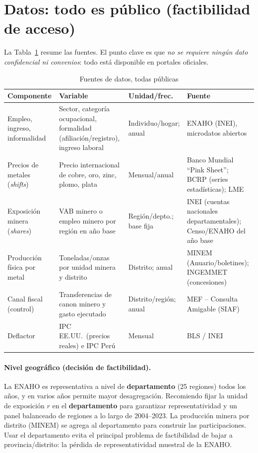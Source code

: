 \documentclass[11pt]{article}
\begin{document}
\section{Datos: todo es público (factibilidad de acceso)}

La Tabla~\ref{tab:datos} resume las fuentes. El punto clave es que \emph{no se requiere ningún
dato confidencial ni convenios}: todo está disponible en portales oficiales.

\begin{table}[h]
\centering
\small
\caption{Fuentes de datos, todas públicas}
\label{tab:datos}
\begin{tabular}{p{3.2cm} p{4.2cm} p{2.3cm} p{4.4cm}}
\toprule
\textbf{Componente} & \textbf{Variable} & \textbf{Unidad/frec.} & \textbf{Fuente} \\
\midrule
Empleo, ingreso, informalidad & Sector, categoría ocupacional, formalidad (afiliación/registro), ingreso laboral & Individuo/hogar; anual & ENAHO (INEI), microdatos abiertos \\
\addlinespace
Precios de metales (\textit{shifts}) & Precio internacional de cobre, oro, zinc, plomo, plata & Mensual/anual & Banco Mundial ``Pink Sheet''; BCRP (series estadísticas); LME \\
\addlinespace
Exposición minera (\textit{shares}) & VAB minero o empleo minero por región en año base & Región/depto.; base fija & INEI (cuentas nacionales departamentales); Censo/ENAHO del año base \\
\addlinespace
Producción física por metal & Toneladas/onzas por unidad minera y distrito & Distrito; anual & MINEM (Anuario/boletines); INGEMMET (concesiones) \\
\addlinespace
Canal fiscal (control) & Transferencias de canon minero y gasto ejecutado & Distrito/región; anual & MEF -- Consulta Amigable (SIAF) \\
\addlinespace
Deflactor & IPC EE.UU.\ (precios reales) e IPC Perú & Mensual & BLS / INEI \\
\bottomrule
\end{tabular}
\end{table}

\paragraph{Nivel geográfico (decisión de factibilidad).} La ENAHO es representativa a nivel de
\textbf{departamento} (25 regiones) todos los años, y en varios años permite mayor
desagregación. Recomiendo fijar la unidad de exposición $r$ en el \textbf{departamento} para
garantizar representatividad y un panel balanceado de regiones a lo largo de 2004--2023. La
producción minera por distrito (MINEM) se agrega al departamento para construir las
participaciones. Usar el departamento evita el principal problema de factibilidad de bajar a
provincia/distrito: la pérdida de representatividad muestral de la ENAHO.
\end{document}
